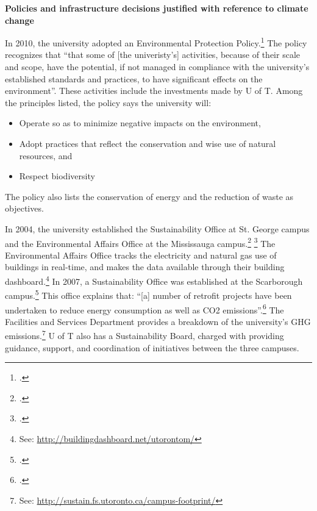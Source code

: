 \textbf{Policies and infrastructure decisions justified with reference to climate change}
\label{UofTActions}






In 2010, the university adopted an Environmental Protection Policy.\footcite[][]{UTEnvProtectionPolicy}
The policy recognizes that ``that some of [the univeristy's] activities, because of their scale and scope, have the potential, if not managed in compliance with the university’s established standards and practices, to have significant effects on the environment''.
These activities include the investments made by U of T.
Among the principles listed, the policy says the university will:
\begin{itemize}
	\item Operate so as to minimize negative impacts on the environment,
	\item Adopt practices that reflect the conservation and wise use of natural resources, and
	\item Respect biodiversity
\end{itemize}
The policy also lists the conservation of energy and the reduction of waste as objectives.



In 2004, the university established the Sustainability Office at St. George campus and the Environmental Affairs Office at the Mississauga campus.\footcite[][]{UTSustOffice} \footcite[][]{}
The Environmental Affairs Office tracks the electricity and natural gas use of buildings in real-time, and makes the data available through their building dashboard.\footnote{See: \url{http://buildingdashboard.net/utorontom/}}
In 2007, a Sustainability Office was established at the Scarborough campus.\footcite[See: ][]{UTSustOffice}
This office explains that: ``[a] number of retrofit projects have been undertaken to reduce energy consumption as well as CO2 emissions''.\footcite[][]{UTSustOfficeEnergy}
The Facilities and Services Department provides a breakdown of the university's GHG emissions.\footnote{See: \url{http://sustain.fs.utoronto.ca/campus-footprint/}}
U of T also has a Sustainability Board, charged with providing guidance, support, and coordination of initiatives between the three campuses.



